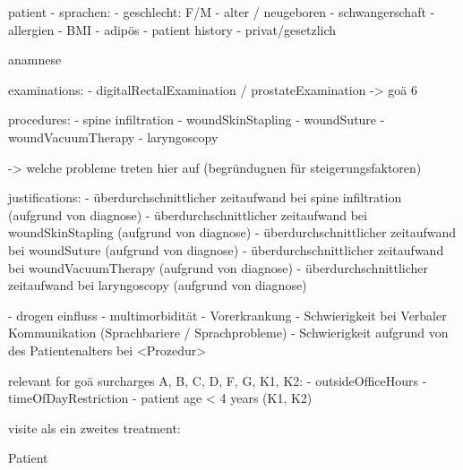 


patient
- sprachen:
- geschlecht: F/M
- alter / neugeboren
- schwangerschaft
- allergien
- BMI
- adipös
- patient history
- privat/gesetzlich

anamnese

examinations:
- digitalRectalExamination / prostateExamination -> goä 6

procedures:
- spine infiltration
- woundSkinStapling
- woundSuture
- woundVacuumTherapy
- laryngoscopy

-> welche probleme treten hier auf (begründugnen für steigerungsfaktoren)



justifications:
- überdurchschnittlicher zeitaufwand bei spine infiltration (aufgrund von diagnose)
- überdurchschnittlicher zeitaufwand bei woundSkinStapling (aufgrund von diagnose)
- überdurchschnittlicher zeitaufwand bei woundSuture (aufgrund von diagnose)
- überdurchschnittlicher zeitaufwand bei woundVacuumTherapy (aufgrund von diagnose)
- überdurchschnittlicher zeitaufwand bei laryngoscopy (aufgrund von diagnose)

- drogen einfluss
- multimorbidität
- Vorerkrankung
- Schwierigkeit bei Verbaler Kommunikation (Sprachbariere / Sprachprobleme)
- Schwierigkeit aufgrund von des Patientenalters bei <Prozedur>


relevant for goä surcharges A, B, C, D, F, G, K1, K2:
- outsideOfficeHours
- timeOfDayRestriction
- patient age < 4 years (K1, K2)

visite als ein zweites treatment:

Patient
